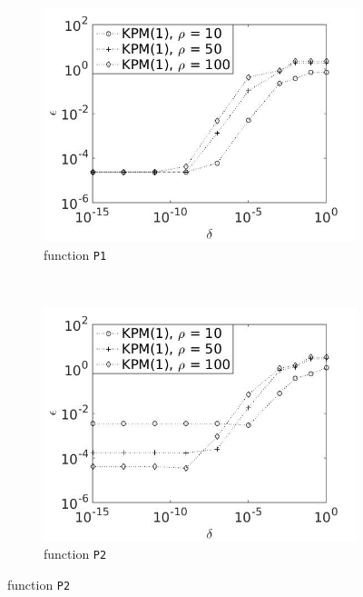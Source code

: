 \begin{figure}[H]
        \centering
        \begin{subfigure}[b]{0.45\textwidth}
                \includegraphics[width=\textwidth]{fig/s15errvstol1m}
                \caption{function \texttt{P1}}
                \label{fig:epsilondelta1}
        \end{subfigure}
~
        \begin{subfigure}[b]{0.45\textwidth}
                \includegraphics[width=\textwidth]{fig/s16errvstol2m}
                \caption{ function \texttt{P2}}
                \label{fig:epsilondelta2}
        \end{subfigure}
        

\end{figure}
